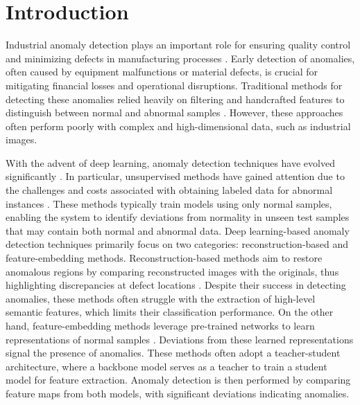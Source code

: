 \section*{Introduction}

Industrial anomaly detection plays an important role for ensuring quality control and minimizing defects in manufacturing processes \cite{chandola2009anomaly, iturbe2017towards}. Early detection of anomalies, often caused by equipment malfunctions or material defects, is crucial for mitigating financial losses and operational disruptions. Traditional methods for detecting these anomalies relied heavily on filtering and handcrafted features to distinguish between normal and abnormal samples \cite{chandola2009anomaly}. However, these approaches often perform poorly with complex and high-dimensional data, such as industrial images.

With the advent of deep learning, anomaly detection techniques have evolved significantly \cite{tao2022deep, cui2023survey}. In particular, unsupervised methods have gained attention due to the challenges and costs associated with obtaining labeled data for abnormal instances \cite{cui2023survey}. These methods typically train models using only normal samples, enabling the system to identify deviations from normality in unseen test samples that may contain both normal and abnormal data. Deep learning-based anomaly detection techniques primarily focus on two categories: reconstruction-based and feature-embedding methods. Reconstruction-based methods aim to restore anomalous regions by comparing reconstructed images with the originals, thus highlighting discrepancies at defect locations \cite{akcay2019ganomaly, yu2023unsupervised, liu2020towards}. Despite their success in detecting anomalies, these methods often struggle with the extraction of high-level semantic features, which limits their classification performance. On the other hand, feature-embedding methods leverage pre-trained networks to learn representations of normal samples \cite{bergmann2020uninformed, salehi2021multiresolution, wang2021student, cao2022informative}. Deviations from these learned representations signal the presence of anomalies. These methods often adopt a teacher-student architecture, where a backbone model serves as a teacher to train a student model for feature extraction. Anomaly detection is then performed by comparing feature maps from both models, with significant deviations indicating anomalies.

